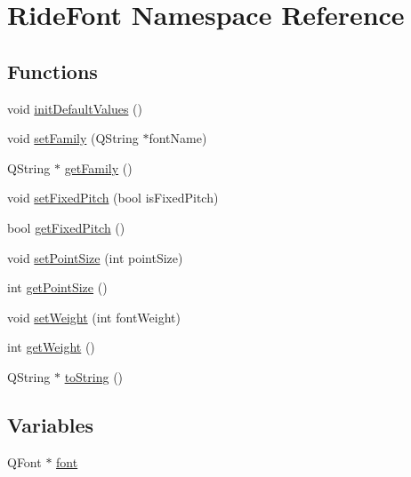 \hypertarget{namespace_ride_font}{\section{Ride\-Font Namespace Reference}
\label{namespace_ride_font}
}
\subsection*{Functions}
\begin{DoxyCompactItemize}
\item 
void \hyperlink{namespace_ride_font_ae1a2ea291e5a7f33c84cbd5219b7a187}{init\-Default\-Values} ()
\item 
void \hyperlink{namespace_ride_font_aecc589296f14c6f3bf80e1228aa1b082}{set\-Family} (Q\-String $\ast$font\-Name)
\item 
Q\-String $\ast$ \hyperlink{namespace_ride_font_ac92f3004cffa8ba62e8bfa42d9b74c81}{get\-Family} ()
\item 
void \hyperlink{namespace_ride_font_ab85fcc5d44b7f024166eba501517e82b}{set\-Fixed\-Pitch} (bool is\-Fixed\-Pitch)
\item 
bool \hyperlink{namespace_ride_font_aa0dc79e821859703b94a7c81e28da266}{get\-Fixed\-Pitch} ()
\item 
void \hyperlink{namespace_ride_font_a3c7a01cd58b8145c965c57eee05f66bd}{set\-Point\-Size} (int point\-Size)
\item 
int \hyperlink{namespace_ride_font_ac613513651567db198b06c5a94b318bc}{get\-Point\-Size} ()
\item 
void \hyperlink{namespace_ride_font_a8b10d54b0df6366cbb3d39f4f5bcd71d}{set\-Weight} (int font\-Weight)
\item 
int \hyperlink{namespace_ride_font_a714379faf4a3c3f0b13bbf03c5cf5a04}{get\-Weight} ()
\item 
Q\-String $\ast$ \hyperlink{namespace_ride_font_aee28ee7dfadd414d022367823d1bf0bc}{to\-String} ()
\end{DoxyCompactItemize}
\subsection*{Variables}
\begin{DoxyCompactItemize}
\item 
Q\-Font $\ast$ \hyperlink{namespace_ride_font_a490a1d138dbd38b50c4fa67d5ae2242b}{font}
\end{DoxyCompactItemize}


